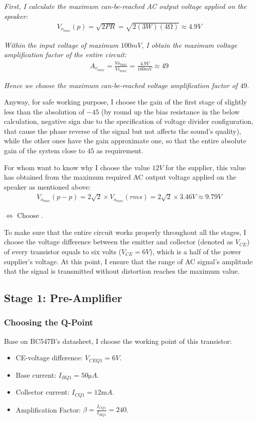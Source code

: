 \documentclass[twoside, a4paper, leqno]{article}
\begin{document}
		\textit{First, I calculate the maximum can-be-reached AC output voltage applied on the speaker:}
		\begin{align}
			V_{o_{max}}(p) = \sqrt{2PR} = \sqrt{2(3W)(4\si{\ohm})} \approx 4.9V
		\end{align}
	
		\textit{Within the input voltage of maximum $100mV$, I obtain the maximum voltage amplification factor of the entire circuit:}
		\begin{align}
			A_{v_{max}} = \frac{Vo_{max}}{Vi_{max}} = \frac{4.9V}{100mV} \approx 49
		\end{align}
		
		\textit{Hence we choose the maximum can-be-reached voltage amplification factor of $49$}.
		
		Anyway, for safe working purpose, I choose the gain of the first stage of slightly less than the absolution of $-45$ (by round up the bias resistance in the below calculation, negative sign due to the specification of voltage divider configuration, that cause the phase reverse of the signal but not affects the sound's quality), while the other ones have the gain approximate one, so that the entire absolute gain of the system close to $45$ as requirement.
		
		For whom want to know why I choose the value $12V$ for the supplier, this value has obtained from the maximum required AC output voltage applied on the speaker as mentioned above:
		\begin{align}
			V_{o_{max}}(p-p) = 2\sqrt{2}\times V_{o_{max}}(rms) = 2\sqrt{2}\times 3.46V \approx 9.79V
		\end{align}
	
		$\Leftrightarrow$ Choose .
		
		To make sure that the entire circuit works properly throughout all the stages, I choose the voltage difference between the emitter and collector (denoted as $V_{CE}$) of every transistor equals to six volts ($V_{CE} = 6V$), which is a half of the power supplier's voltage. At this point, I ensure that the range of AC signal's amplitude that the signal is transmitted without distortion reaches the maximum value.
		
	\subsection{Stage 1: Pre-Amplifier}
		\subsubsection*{Choosing the Q-Point}
		Base on BC547B's datasheet, I choose the working point of this transistor: 
		\begin{itemize}
			\item CE-voltage difference: $V_{CEQ1} = 6V$.
			\item Base current: $I_{BQ1} = 50\si{\micro}A$.
			\item Collector current: $I_{CQ1} = 12\si{\milli}A$.
			\item Amplification Factor: $\beta = \frac{I_{CQ1}}{I_{BQ1}} = 240$.
		\end{itemize}		
		
\end{document}
